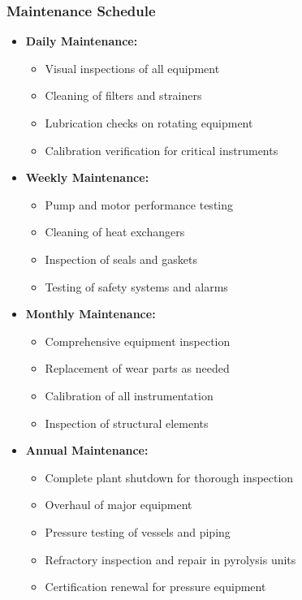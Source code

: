 \subsubsection{Maintenance Schedule}
\begin{itemize}
    \item \textbf{Daily Maintenance:}
    \begin{itemize}
        \item Visual inspections of all equipment
        \item Cleaning of filters and strainers
        \item Lubrication checks on rotating equipment
        \item Calibration verification for critical instruments
    \end{itemize}
    
    \item \textbf{Weekly Maintenance:}
    \begin{itemize}
        \item Pump and motor performance testing
        \item Cleaning of heat exchangers
        \item Inspection of seals and gaskets
        \item Testing of safety systems and alarms
    \end{itemize}
    
    \item \textbf{Monthly Maintenance:}
    \begin{itemize}
        \item Comprehensive equipment inspection
        \item Replacement of wear parts as needed
        \item Calibration of all instrumentation
        \item Inspection of structural elements
    \end{itemize}
    
    \item \textbf{Annual Maintenance:}
    \begin{itemize}
        \item Complete plant shutdown for thorough inspection
        \item Overhaul of major equipment
        \item Pressure testing of vessels and piping
        \item Refractory inspection and repair in pyrolysis units
        \item Certification renewal for pressure equipment
    \end{itemize}
\end{itemize}

